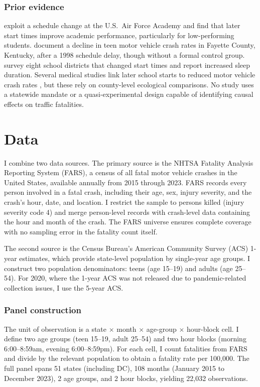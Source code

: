 \documentclass[12pt]{article}
\begin{document}
\subsubsection*{Prior evidence} \citet{carrell2011does} exploit a schedule change at the U.S.\ Air Force Academy and find that later start times improve academic performance, particularly for low-performing students. \citet{danner2008adolescent} document a decline in teen motor vehicle crash rates in Fayette County, Kentucky, after a 1998 schedule delay, though without a formal control group. \citet{wahlstrom2014examining} survey eight school districts that changed start times and report increased sleep duration. Several medical studies link later school starts to reduced motor vehicle crash rates \citep{vorona2011dissimilar, foss2010sleep}, but these rely on county-level ecological comparisons. No study uses a statewide mandate or a quasi-experimental design capable of identifying causal effects on traffic fatalities.

\section{Data}

I combine two data sources. The primary source is the NHTSA Fatality Analysis Reporting System (FARS), a census of all fatal motor vehicle crashes in the United States, available annually from 2015 through 2023. FARS records every person involved in a fatal crash, including their age, sex, injury severity, and the crash's hour, date, and location. I restrict the sample to persons killed (injury severity code 4) and merge person-level records with crash-level data containing the hour and month of the crash. The FARS universe ensures complete coverage with no sampling error in the fatality count itself.

The second source is the Census Bureau's American Community Survey (ACS) 1-year estimates, which provide state-level population by single-year age groups. I construct two population denominators: teens (age 15--19) and adults (age 25--54). For 2020, where the 1-year ACS was not released due to pandemic-related collection issues, I use the 5-year ACS.

\subsubsection*{Panel construction} The unit of observation is a state $\times$ month $\times$ age-group $\times$ hour-block cell. I define two age groups (teen 15--19, adult 25--54) and two hour blocks (morning 6:00--8:59am, evening 6:00--8:59pm). For each cell, I count fatalities from FARS and divide by the relevant population to obtain a fatality rate per 100,000. The full panel spans 51 states (including DC), 108 months (January 2015 to December 2023), 2 age groups, and 2 hour blocks, yielding 22,032 observations.
\end{document}
